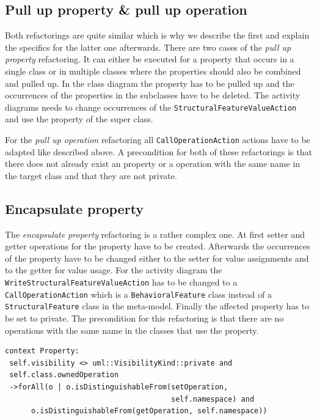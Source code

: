 \documentclass{llncs}
\begin{document}

\subsection{Pull up property \& pull up operation}
\label{sec:pullup}
Both refactorings are quite similar which is why we describe the first and explain the specifics for the latter one afterwards. 
There are two cases of the \textit{pull up property} refactoring. It can either be executed for a property that occurs in 
a single class or in multiple classes where the properties should also be combined and pulled up. In the class diagram 
the property has to be pulled up and the occurrences of the properties in the subclasses have to be deleted. The 
activity diagrams needs to change occurrences of the \texttt{StructuralFeatureValueAction} and use the property of 
the super class.

For the \textit{pull up operation} refactoring all \texttt{Call\-Operation\-Action} actions have to be adapted like described 
above. A precondition for both of these refactorings is that there does not already exist an property or a operation with the same name 
in the target class and that they are not private.

\subsection{Encapsulate property}
\label{sec:encapsulate}
The \textit{encapsulate property} refactoring is a rather complex one. At first setter and getter operations for the property have to be 
created. Afterwards the occurrences of the property have to be changed either to the setter for value assignments and to the getter 
for value usage. For the activity diagram the \texttt{Write\-Structural\-Feature\-Value\-Action} has to be changed to a 
\texttt{Call\-Operation\-Action} which is a \texttt{BehavioralFeature} class instead of a \texttt{StructuralFeature} class in 
the meta-model. Finally the affected property has to be set to private. The precondition for this refactoring is that there are no 
operations with the same name in the classes that use the property.

\begin{lstlisting}[language=OCL,caption=OCL for encapsulate property,label=lst:encapsulateproperty]
context Property:
 self.visibility <> uml::VisibilityKind::private and
 self.class.ownedOperation
 ->forAll(o | o.isDistinguishableFrom(setOperation,
                                      self.namespace) and
      o.isDistinguishableFrom(getOperation, self.namespace))
\end{lstlisting}
\end{document}
